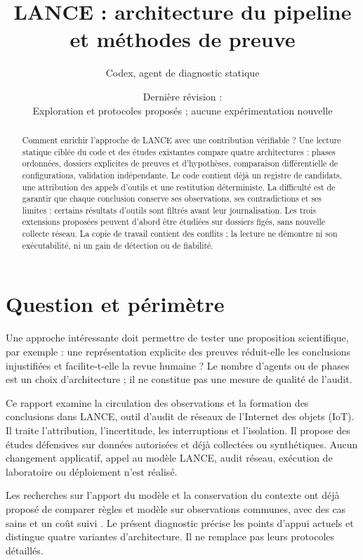 \documentclass[11pt,a4paper]{article}
\title{LANCE : architecture du pipeline\\et méthodes de preuve}
\author{Codex, agent de diagnostic statique}
\date{Dernière révision : \revision\\[3pt]
  \small Exploration et protocoles proposés ; aucune expérimentation nouvelle}
\begin{document}
\maketitle
\begin{abstract}
Comment enrichir l'approche de LANCE avec une contribution vérifiable ? Une
lecture statique ciblée du code et des études existantes compare quatre
architectures : phases ordonnées, dossiers explicites de preuves et d'hypothèses,
comparaison différentielle de configurations, validation indépendante. Le code
contient déjà un registre de candidats, une attribution des appels d'outils et
une restitution déterministe. La difficulté est de garantir que chaque
conclusion conserve ses observations, ses contradictions et ses limites :
certains résultats d'outils sont filtrés avant leur journalisation. Les trois
extensions proposées peuvent d'abord être étudiées sur dossiers figés, sans
nouvelle collecte réseau. La copie de travail contient des conflits ; la lecture
ne démontre ni son exécutabilité, ni un gain de détection ou de fiabilité.
\end{abstract}
\tableofcontents

\section{Question et périmètre}
Une approche intéressante doit permettre de tester une proposition scientifique,
par exemple : une représentation explicite des preuves réduit-elle les
conclusions injustifiées et facilite-t-elle la revue humaine ? Le nombre
d'agents ou de phases est un choix d'architecture ; il ne constitue pas une
mesure de qualité de l'audit.

Ce rapport examine la circulation des observations et la formation des
conclusions dans LANCE, outil d'audit de réseaux de l'Internet des objets
(IoT). Il traite l'attribution, l'incertitude, les interruptions et l'isolation.
Il propose des études défensives sur données autorisées et déjà collectées ou
synthétiques. Aucun changement applicatif, appel au modèle LANCE, audit réseau,
exécution de laboratoire ou déploiement n'est réalisé.

Les recherches sur l'apport du modèle et la conservation du contexte ont déjà
proposé de comparer règles et modèle sur observations communes, avec des cas
sains et un coût suivi \cite{travaux}. Le présent diagnostic précise les points
d'appui actuels et distingue quatre variantes d'architecture. Il ne remplace
pas leurs protocoles détaillés.
\end{document}
